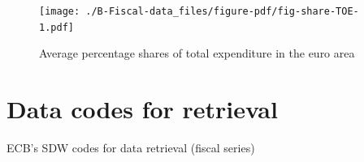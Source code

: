 \documentclass[
  letterpaper,
  authoryear,
  preprint,
  3p]{elsarticle}
\begin{document}
\begin{figure}[H]

{\centering \texttt{[image: ./B-Fiscal-data\_files/figure-pdf/fig-share-TOE-1.pdf]}

}

\caption{\label{fig-share-TOE}Average percentage shares of total
expenditure in the euro area}

\end{figure}

\hypertarget{sec-code-retrieval}{%
\chapter{Data codes for retrieval}\label{sec-code-retrieval}}

\hypertarget{tbl-Code-series-fiscal}{}
\begin{table}
\caption{\label{tbl-Code-series-fiscal}ECB's SDW codes for data retrieval (fiscal series) }\tabularnewline


\end{table}
\end{document}
